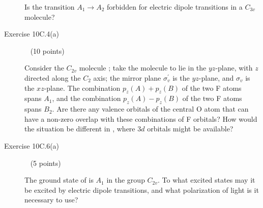 \documentclass[10pt, letterpaper]{memoir}
\begin{document}
\begin{description}
	Is the transition $A_1\rightarrow A_2$ forbidden for electric dipole transitions in a $C_{3v}$ molecule?
	
	\vspace{5em}
	\item [Exercise 10C.4(a)] ~ (10 points)
	
	Consider the $C_{2v}$ molecule ; take the molecule to lie in the $yz$-plane, with $z$ directed along the $C_2$ axis; the mirror plane $\sigma^\prime_v$ is the $yz$-plane, and $\sigma_v$ is the $xz$-plane. The combination $p_z(A)+p_z(B)$ of the two F atoms spans $A_1$, and the combination $p_z(A)-p_z(B)$ of the two F atoms spans $B_2$. Are there any valence orbitals of the central O atom that can have a non-zero overlap with these combinations of F orbitals? How would the situation be different in , where $3d$ orbitals might be available?
	
	\vspace{20em}
	\item [Exercise 10C.6(a)] ~ (5 points)
	
	The ground state of  is $A_1$ in the group $C_{2v}$. To what excited states may it be excited by electric dipole transitions, and what polarization of light is it necessary to use?
\end{description}
\end{document}
